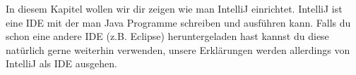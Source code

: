 

In diesem Kapitel wollen wir dir zeigen wie man IntelliJ einrichtet. IntelliJ ist eine IDE mit der man Java Programme schreiben und ausführen kann. Falls du schon eine andere IDE (z.B. Eclipse) heruntergeladen hast kannst du diese natürlich gerne weiterhin verwenden, unsere Erklärungen werden allerdings von IntelliJ als IDE ausgehen.

\addexcercise
\addexcercise
\addexcercise
\addexcercise